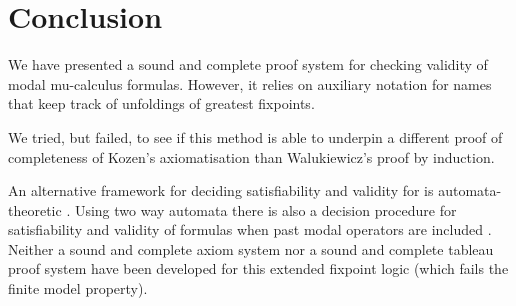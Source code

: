 \documentclass[copyright,creativecommons]{eptcs}
\begin{document}
\section{Conclusion}

We have presented a sound and complete proof system  for checking validity
of modal mu-calculus formulas. However, it relies on auxiliary notation for
names that keep track of  unfoldings of greatest fixpoints. 

We  tried,  but failed,  to
see if this  method is able to underpin a different proof of completeness
of Kozen's axiomatisation  than  Walukiewicz's 
proof by induction.  

An alternative framework for deciding satisfiability and validity for
 is automata-theoretic  \cite{StE89}. Using two way automata
there is also a decision procedure for  satisfiability and validity
of formulas when past  
modal operators are  included
\cite{V98}. 
Neither a sound and complete 
axiom system nor a sound and complete tableau  proof system
have been developed for this extended fixpoint  logic (which fails 
the finite model property). 
 

\end{document}

